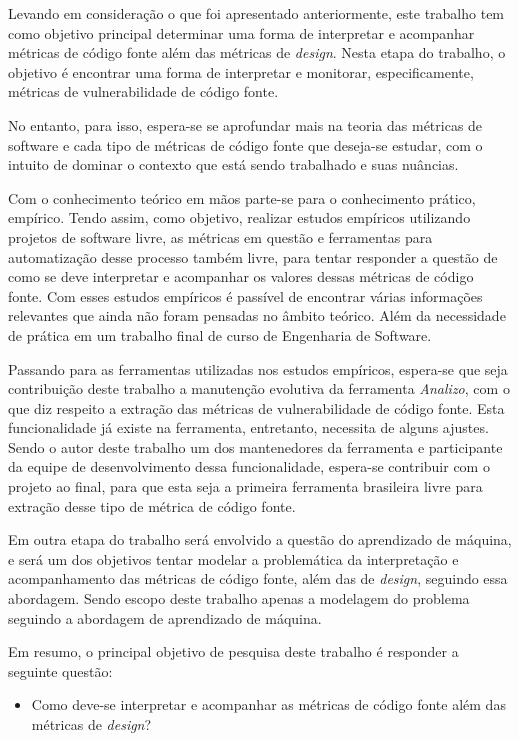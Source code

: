 Levando em consideração o que foi apresentado anteriormente, este trabalho tem
como objetivo principal determinar uma forma de interpretar e acompanhar
métricas de código fonte além das métricas de \textit{design}. Nesta
etapa do trabalho, o objetivo é encontrar uma forma de interpretar e monitorar,
especificamente, métricas de vulnerabilidade de código fonte.

No entanto, para isso, espera-se se aprofundar mais na teoria das métricas de
software e cada tipo de métricas de código fonte que deseja-se estudar, com o 
intuito de dominar o contexto que está sendo trabalhado e suas nuâncias.

Com o conhecimento teórico em mãos parte-se para o conhecimento prático,
empírico. Tendo assim, como objetivo, realizar estudos empíricos utilizando 
projetos de software livre, as métricas em questão e ferramentas para 
automatização desse processo também livre, para tentar responder a questão de 
como se deve interpretar e acompanhar os valores dessas métricas de código fonte.
Com esses estudos empíricos é passível de encontrar várias informações relevantes
que ainda não foram pensadas no âmbito teórico. Além da necessidade de prática
em um trabalho final de curso de Engenharia de Software.

Passando para as ferramentas utilizadas nos estudos empíricos, espera-se que
seja contribuição deste trabalho a manutenção evolutiva da ferramenta
\emph{Analizo}, com o que diz respeito a extração das métricas de
vulnerabilidade de código fonte. Esta funcionalidade já existe na ferramenta,
entretanto, necessita de alguns ajustes. Sendo o autor deste trabalho um dos
mantenedores da ferramenta e participante da equipe de desenvolvimento dessa
funcionalidade, espera-se contribuir com o projeto ao final, para que esta seja
a primeira ferramenta brasileira livre para extração desse tipo de métrica de 
código fonte.

Em outra etapa do trabalho será envolvido a questão do aprendizado de máquina, e
será um dos objetivos tentar modelar a problemática da interpretação e
acompanhamento das métricas de código fonte, além das de \textit{design},
seguindo essa abordagem. Sendo escopo deste trabalho apenas a modelagem do
problema seguindo a abordagem de aprendizado de máquina.

Em resumo, o principal objetivo de pesquisa deste trabalho é responder a
seguinte questão:

\begin{itemize}
  \item Como deve-se interpretar e acompanhar as métricas de código fonte além 
    das métricas de \textit{design}?
\end{itemize}


